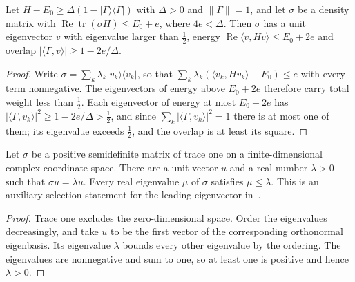 \begin{theorem}
    \label{thm:dominant_low_energy_eigenvector}
    \leanok
    Let $H-E_0\ge\Delta(1-\lvert\Gamma\rangle\langle\Gamma\rvert)$ with
    $\Delta>0$ and $\lVert\Gamma\rVert=1$, and let $\sigma$ be a density matrix
    with $\operatorname{Re}\operatorname{tr}(\sigma H)\le E_0+e$, where
    $4e<\Delta$. Then $\sigma$ has a unit eigenvector $v$ with eigenvalue larger
    than $\tfrac12$, energy
    $\operatorname{Re}\langle v,Hv\rangle\le E_0+2e$ and overlap
    $\lvert\langle\Gamma,v\rangle\rvert\ge1-2e/\Delta$.
\end{theorem}

\begin{proof}
    \leanok
    Write $\sigma=\sum_k\lambda_k\lvert v_k\rangle\langle v_k\rvert$, so that
    $\sum_k\lambda_k(\langle v_k,Hv_k\rangle-E_0)\le e$ with every term
    nonnegative. The eigenvectors of energy above $E_0+2e$ therefore carry total
    weight less than $\tfrac12$. Each eigenvector of energy at most $E_0+2e$ has
    $\lvert\langle\Gamma,v_k\rangle\rvert^2\ge1-2e/\Delta>\tfrac12$, and since
    $\sum_k\lvert\langle\Gamma,v_k\rangle\rvert^2=1$ there is at most one of
    them; its eigenvalue exceeds $\tfrac12$, and the overlap is at least its
    square.
\end{proof}

\begin{theorem}
    \label{thm:density_max_eigenvector}
    \leanok
    Let $\sigma$ be a positive semidefinite matrix of trace one on a
    finite-dimensional complex coordinate space. There are a unit vector
    $u$ and a real number $\lambda>0$ such that $\sigma u=\lambda u$.
    Every real eigenvalue $\mu$ of $\sigma$ satisfies $\mu\le\lambda$.
    This is an auxiliary selection statement for the leading eigenvector
    in~\cite[Lemma~2.5, source lines 493--505]{Landau2013PolynomialTime}.
\end{theorem}
\begin{proof}\leanok
    Trace one excludes the zero-dimensional space. Order the eigenvalues
    decreasingly, and take $u$ to be the first vector of the corresponding
    orthonormal eigenbasis. Its eigenvalue $\lambda$ bounds every other
    eigenvalue by the ordering. The eigenvalues are nonnegative and sum
    to one, so at least one is positive and hence $\lambda>0$.
\end{proof}

